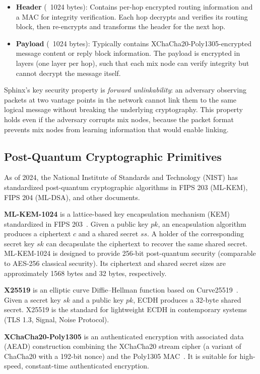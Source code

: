 \documentclass[11pt]{article}
\theoremstyle{definition}
\theoremstyle{remark}
\begin{document}
\begin{itemize}
    \item \textbf{Header} (~1024 bytes): Contains per-hop encrypted routing information and a MAC for integrity verification. Each hop decrypts and verifies its routing block, then re-encrypts and transforms the header for the next hop.

    \item \textbf{Payload} (~1024 bytes): Typically contains XChaCha20-Poly1305-encrypted message content or reply block information. The payload is encrypted in layers (one layer per hop), such that each mix node can verify integrity but cannot decrypt the message itself.
\end{itemize}

Sphinx's key security property is \emph{forward unlinkability}: an adversary observing packets at two vantage points in the network cannot link them to the same logical message without breaking the underlying cryptography. This property holds even if the adversary corrupts mix nodes, because the packet format prevents mix nodes from learning information that would enable linking.

\subsection{Post-Quantum Cryptographic Primitives}

As of 2024, the National Institute of Standards and Technology (NIST) has standardized post-quantum cryptographic algorithms in FIPS 203 (ML-KEM), FIPS 204 (ML-DSA), and other documents.

\textbf{ML-KEM-1024} is a lattice-based key encapsulation mechanism (KEM) standardized in FIPS 203~\cite{nist-mlkem}. Given a public key $pk$, an encapsulation algorithm produces a ciphertext $c$ and a shared secret $ss$. A holder of the corresponding secret key $sk$ can decapsulate the ciphertext to recover the same shared secret. ML-KEM-1024 is designed to provide 256-bit post-quantum security (comparable to AES-256 classical security). Its ciphertext and shared secret sizes are approximately 1568 bytes and 32 bytes, respectively.

\textbf{X25519} is an elliptic curve Diffie--Hellman function based on Curve25519~\cite{curve25519}. Given a secret key $sk$ and a public key $pk$, ECDH produces a 32-byte shared secret. X25519 is the standard for lightweight ECDH in contemporary systems (TLS 1.3, Signal, Noise Protocol).

\textbf{XChaCha20-Poly1305} is an authenticated encryption with associated data (AEAD) construction combining the XChaCha20 stream cipher (a variant of ChaCha20 with a 192-bit nonce) and the Poly1305 MAC~\cite{poly1305}. It is suitable for high-speed, constant-time authenticated encryption.
\end{document}
